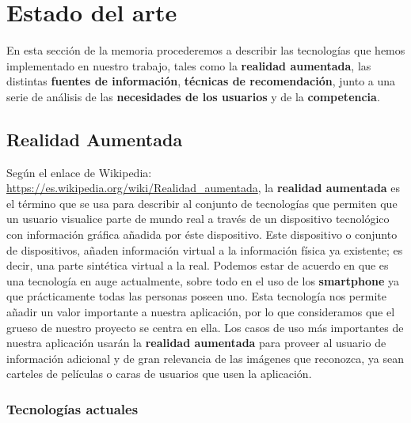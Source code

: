 
\cleardoublepage


\chapter{Estado del arte}
\label{makereference2}
En esta sección de la memoria procederemos a describir las tecnologías que hemos implementado
en nuestro trabajo, tales como la \textbf{realidad aumentada}, las distintas \textbf{fuentes de información}, 
\textbf{técnicas de recomendación}, junto a una serie de análisis de las \textbf{necesidades de los usuarios} y de la \textbf{competencia}.
\section{Realidad Aumentada}
\label{makereference2.1}
Según el enlace de Wikipedia: \url{https://es.wikipedia.org/wiki/Realidad_aumentada}, la \textbf{realidad aumentada} es el término que se 
usa para describir al conjunto de tecnologías que permiten que un usuario visualice parte de mundo real a través de un dispositivo tecnológico 
con información gráfica añadida por éste dispositivo. Este dispositivo o conjunto de dispositivos, añaden información virtual a la información 
física ya existente; es decir, una parte sintética virtual a la real. Podemos estar de acuerdo en que es una tecnología en auge actualmente, sobre todo 
en el uso de los \textbf{smartphone} ya que prácticamente todas las personas poseen uno. Esta tecnología nos permite añadir un valor importante a 
nuestra aplicación, por lo que consideramos que el grueso de nuestro proyecto se centra en ella. Los casos de uso más importantes de nuestra aplicación 
usarán la \textbf{realidad aumentada} para proveer al usuario de información adicional y de gran relevancia de las imágenes que reconozca, ya sean carteles
de películas o caras de usuarios que usen la aplicación.
\subsection{Tecnologías actuales}
\label{makereference2.1.1}
